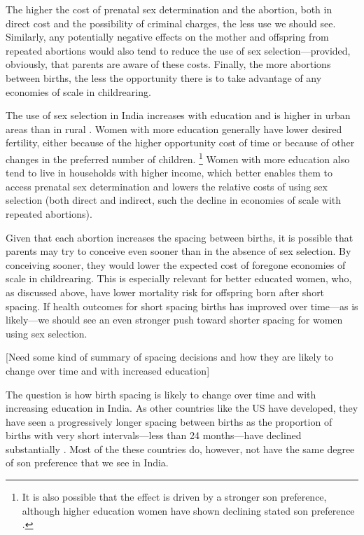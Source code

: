 The higher the cost of prenatal sex determination and the abortion, both in direct cost
and the possibility of criminal charges, the less use we should see.
Similarly, any potentially negative effects on the mother and offspring from repeated
abortions would also tend to reduce the use of sex selection---provided, obviously, that
parents are aware of these costs.
Finally, the more abortions between births, the less the opportunity there is to take
advantage of any economies of scale in childrearing.


The use of sex selection in India increases with education and is higher in urban
areas than in rural
\citep{das_gupta97,retherford03b,jha06,Guilmoto2009a,Bongaarts2013,Portner2015b,
Jayachandran2017}.
Women with more education generally have lower desired fertility, either because of the
higher opportunity cost of time or because of other changes in the preferred number of
children.%
\footnote{
It is also possible that the effect is driven by a stronger son preference, although 
higher education women have shown declining stated son preference \citep{bhat03,pande07}.
}
Women with more education also tend to live in households with higher income,
which better enables them to access prenatal sex determination and lowers the relative
costs of using sex selection (both direct and indirect, such the decline in 
economies of scale with repeated abortions).

Given that each abortion increases the spacing between births, it is possible that
parents may try to conceive even sooner than in the absence of sex selection.
By conceiving sooner, they would lower the expected cost of foregone economies of scale in 
childrearing.
This is especially relevant for better educated women, who, as discussed above, have
lower mortality risk for offspring born after short spacing.
If health outcomes for short spacing births has improved over time---as is likely---we
should see an even stronger push toward shorter spacing for women using sex selection.


[Need some kind of summary of spacing decisions and how they are likely to change
over time and with increased education]

The question is how birth spacing is likely to change over time and with increasing
education in India.
As other countries like the US have developed, they have seen a progressively longer 
spacing between births as the proportion of births with very short intervals---less than 
24 months---have declined substantially \citep{Hotz1997}.
Most of the these countries do, however, not have the same degree of son preference that
we see in India.

